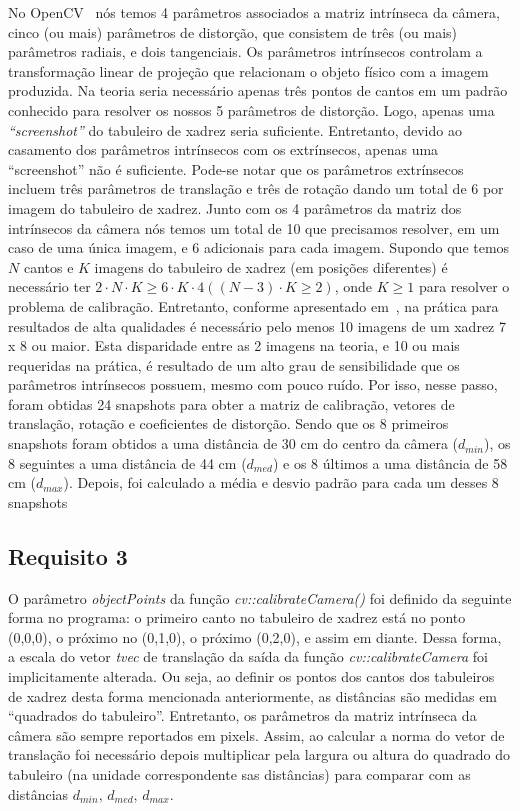 \documentclass{bmvc2k}
\begin{document}
No OpenCV~\cite{opencvmanual} nós temos 4 parâmetros associados a matriz intrínseca da câmera, cinco (ou mais) parâmetros de distorção, que consistem de três (ou mais) parâmetros radiais, e dois tangenciais. Os parâmetros intrínsecos controlam a transformação linear de projeção que relacionam o objeto físico com a imagem produzida. Na teoria seria necessário apenas três pontos de cantos em um padrão conhecido para resolver os nossos 5 parâmetros de distorção. Logo, apenas uma \textit{``screenshot''} do tabuleiro de xadrez seria suficiente. Entretanto, devido ao casamento dos parâmetros intrínsecos com os extrínsecos, apenas uma ``screenshot'' não é suficiente. Pode-se notar que os parâmetros extrínsecos incluem três parâmetros de translação e três de rotação dando um total de 6 por imagem do tabuleiro de xadrez. Junto com os 4 parâmetros da matriz dos intrínsecos da câmera nós temos um total de 10 que precisamos resolver, em um caso de uma única imagem, e 6 adicionais para cada imagem. Supondo que temos $N$ cantos e $K$ imagens do tabuleiro de xadrez (em posições diferentes) é necessário ter $2 \cdot N \cdot K \geq 6 \cdot K \cdot 4 ((N - 3)\cdot K \geq 2)$, onde $K \ge 1$ para resolver o problema de calibração. Entretanto, conforme apresentado em~\cite{kaehler2016learning}, na prática para resultados de alta qualidades é necessário pelo menos 10 imagens de um xadrez 7 x 8 ou maior. Esta disparidade entre as 2 imagens na teoria, e 10 ou mais requeridas na prática, é resultado de um alto grau de sensibilidade que os parâmetros intrínsecos possuem, mesmo com pouco ruído. Por isso, nesse passo, foram obtidas 24 snapshots para obter a matriz de calibração, vetores de translação, rotação e coeficientes de distorção. Sendo que os 8 primeiros snapshots foram obtidos a uma distância de 30 cm do centro da câmera ($d_{min}$), os 8 seguintes a uma distância de 44 cm ($d_{med}$) e os 8 últimos a uma distância de 58 cm ($d_{max}$). Depois, foi calculado a média e desvio padrão para cada um desses 8 snapshots  

\subsection{Requisito 3}
O parâmetro \textit{objectPoints} da função \textit{cv::calibrateCamera()} foi definido da seguinte forma no programa: o primeiro canto no tabuleiro de xadrez está no ponto (0,0,0), o próximo no (0,1,0), o próximo (0,2,0), e assim em diante. Dessa forma, a escala do vetor \textit{tvec} de translação da saída da função \textit{cv::calibrateCamera} foi implicitamente alterada. Ou seja, ao definir os pontos dos cantos dos tabuleiros de xadrez desta forma mencionada anteriormente, as distâncias são medidas em ``quadrados do tabuleiro''. Entretanto, os parâmetros da matriz intrínseca da câmera são sempre reportados em pixels. Assim, ao calcular a norma do vetor de translação foi necessário depois multiplicar pela largura ou altura do quadrado do tabuleiro (na unidade correspondente sas distâncias) para comparar com as distâncias $d_{min},\,d_{med},\,d_{max}$. 
\end{document}
